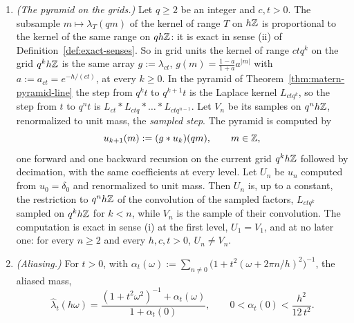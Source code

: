 \begin{proposition}
\begin{enumerate}
$s < t$: an exact cascade on the grid, and translation
covariant. Convolution with
$p\delta_0 + (1-p)\varepsilon^+_t$ maps a bounded sequence $y$ to the unique bounded solution $v$ of
\[
  v(n) = a_t\,v(n-1) + (1 - a_t + pa_t)\,y(n) - pa_t\,y(n-1),
\]
one forward recursion with one state, and the factor with $\varepsilon^-_t$ is the same recursion run
backward. For an integer $\gamma \ge 1$ the powers $\lambda^{*\gamma}_{s,t}$ form a cascade family
of the same kind, with $\gamma$ forward and $\gamma$ backward recursions per increment.
\item \emph{(The \Matern{} pyramid on the grids.)} Let $q \ge 2$ be an integer and $c, t > 0$.
The subsample $m \mapsto \lambda_T(qm)$ of the kernel of range $T$ on $h\mathbb{Z}$ is proportional to the
kernel of the same range on $q h\mathbb{Z}$: it is exact in sense (ii) of
Definition~\ref{def:exact-senses}. So in grid units the kernel of range $ctq^k$ on the grid
$q^kh\mathbb{Z}$ is the same array $g := \lambda_{ct}$, $g(m) = \tfrac{1-a}{1+a}a^{|m|}$ with
$a := a_{ct} = e^{-h/(ct)}$, at every $k \ge 0$. In the \Matern{} pyramid of
Theorem~\ref{thm:matern-pyramid-line} the step from $q^kt$ to $q^{k+1}t$ is the Laplace kernel
$L_{ctq^k}$, so the step from $t$ to $q^nt$ is $L_{ct} * L_{ctq} * \dots * L_{ctq^{n-1}}$. Let
$V_n$ be its samples on $q^nh\mathbb{Z}$, renormalized to unit mass, the \emph{sampled step}. The pyramid
is computed by
\[
  u_{k+1}(m) := (g * u_k)(qm), \qquad m \in \mathbb{Z} ,
\]
one forward and one backward recursion on the current grid $q^kh\mathbb{Z}$ followed by decimation, with
the same coefficients at every level. Let $U_n$ be $u_n$ computed from $u_0 = \delta_0$ and
renormalized to unit mass. Then $U_n$ is, up to a constant, the restriction to $q^nh\mathbb{Z}$ of the
convolution of the sampled factors, $L_{ctq^k}$ sampled on $q^kh\mathbb{Z}$ for $k < n$, while $V_n$ is the
sample of their convolution. The computation is exact in sense (i) at the first level,
$U_1 = V_1$, and at no later one: for every $n \ge 2$ and every $h, c, t > 0$, $U_n \ne V_n$.
\item \emph{(Aliasing.)} For $t > 0$, with
$\alpha_t(\omega) := \sum_{n \ne 0}\bigl(1 + t^2(\omega + 2\pi n/h)^2\bigr)^{-1}$, the aliased mass,
\[
  \widehat\lambda_t(h\omega) = \frac{(1 + t^2\omega^2)^{-1} + \alpha_t(\omega)}{1 + \alpha_t(0)} ,
  \qquad 0 < \alpha_t(0) < \frac{h^2}{12\,t^2} .
\]
\end{enumerate}
\end{proposition}

